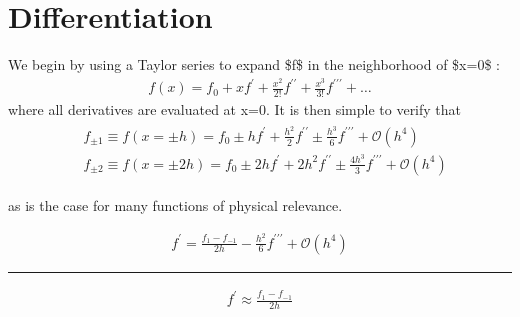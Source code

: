 \documentclass[letterpaper,10pt,english]{sphinxmanual}
\begin{document}
\section{Differentiation}
\label{\detokenize{basicmath/basicmath:differentiation}}
\sphinxAtStartPar
We begin by using a Taylor series to expand \$f\$ in the neighborhood of \$x=0\$ :
\begin{equation*}
\begin{split}f(x)=f_{0}+x f^{\prime}+\frac{x^{2}}{2 !} f^{\prime \prime}+\frac{x^{3}}{3 !} f^{\prime \prime \prime}+\ldots\end{split}
\end{equation*}
\sphinxAtStartPar
where all derivatives are evaluated at x=0. It is then simple to verify that
\begin{equation*}
\begin{split}\begin{aligned}
&f_{\pm 1} \equiv f(x=\pm h)=f_{0} \pm h f^{\prime}+\frac{h^{2}}{2} f^{\prime \prime} \pm \frac{h^{3}}{6} f^{\prime \prime \prime}+\mathcal{O}\left(h^{4}\right) \\
&f_{\pm 2} \equiv f(x=\pm 2 h)=f_{0} \pm 2 h f^{\prime}+2 h^{2} f^{\prime \prime} \pm \frac{4 h^{3}}{3} f^{\prime \prime \prime}+\mathcal{O}\left(h^{4}\right)
\end{aligned}\end{split}
\end{equation*}\begin{description}
\begin{description}
\sphinxAtStartPar
as is the case for many functions of physical relevance.

\end{description}

\end{description}
\begin{equation*}
\begin{split}f^{\prime}=\frac{f_{1}-f_{-1}}{2 h}-\frac{h^{2}}{6} f^{\prime \prime \prime}+\mathcal{O}\left(h^{4}\right)\end{split}
\end{equation*}

\bigskip\hrule\bigskip

\begin{equation*}
\begin{split}f^{\prime} \approx \frac{f_{1}-f_{-1}}{2 h}\end{split}
\end{equation*}
\end{document}
